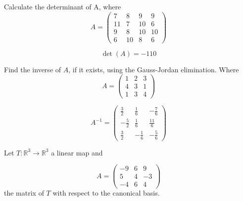 \begin{questions}

\question Calculate the determinant of A, where
$$
A=\left(\begin{array}{rrrr}
7 & 8 & 9 & 9 \\
11 & 7 & 10 & 6 \\
9 & 8 & 10 & 10 \\
6 & 10 & 8 & 6
\end{array}\right)
$$

\begin{solution}
$$\det(A)=-110$$
\end{solution}

\question Find the inverse of $A$, if it exists, using the Gauss-Jordan elimination. Where
$$
A=\left(\begin{array}{rrr}
1 & 2 & 3 \\
4 & 3 & 1 \\
1 & 3 & 4
\end{array}\right)
$$

\begin{solution}
$$A^{-1}=\left(\begin{array}{rrr}
\frac{3}{2} & \frac{1}{6} & -\frac{7}{6} \\
-\frac{5}{2} & \frac{1}{6} & \frac{11}{6} \\
\frac{3}{2} & -\frac{1}{6} & -\frac{5}{6}
\end{array}\right)$$
\end{solution}

\question Let $T:\mathbb{R}^3\rightarrow\mathbb{R}^3$  a linear map and
 
$$
A=\left(\begin{array}{rrr}
-9 & 6 & 9 \\
5 & 4 & -3 \\
-4 & 6 & 4
\end{array}\right)
$$
the matrix of $T$ with respect to the canonical basis.
\end{questions}
